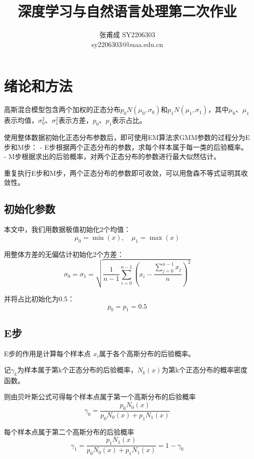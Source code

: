 \documentclass[11pt]{article}
\title{深度学习与自然语言处理第二次作业}
\author{张甫成 SY2206303\\sy2206303@buaa.edu.cn}
\begin{document}
    
    \maketitle



    \hypertarget{ux7eeaux8bbaux548cux65b9ux6cd5}{%
\section{绪论和方法}\label{ux7eeaux8bbaux548cux65b9ux6cd5}}

    高斯混合模型包含两个加权的正态分布\(p_0 N(\mu_0,\sigma_0)\)和\(p_1N(\mu_1,\sigma_1)\)，其中\(\mu_0\)、\(\mu_1\)表示均值，\(\sigma_0^2\)、\(\sigma_1^2\)表示方差，\(p_0\)、\(p_1\)表示占比。

使用整体数据初始化正态分布参数后，即可使用EM算法求GMM参数的过程分为E步和M步：
- E步根据两个正态分布的参数，求每个样本属于每一类的后验概率。 -
M步根据求出的后验概率，对两个正态分布的参数进行最大似然估计。

重复执行E步和M步，两个正态分布的参数即可收敛，可以用詹森不等式证明其收敛性。

    \hypertarget{ux521dux59cbux5316ux53c2ux6570}{%
\subsection{初始化参数}\label{ux521dux59cbux5316ux53c2ux6570}}

本文中，我们用数据极值初始化2个均值：
\[\mu_0=\min(x),\quad \mu_1=\max(x)\]

用整体方差的无偏估计初始化2个方差：
\[\sigma_0=\sigma_1=\sqrt{\frac{1}{n-1}\sum_{i=0}^{n-1}(x_i -  \frac{\sum_{j=0}^{n-1}x_j}{n})^2}\]

并将占比初始化为0.5： \[p_0=p_1=0.5\]

    \hypertarget{eux6b65}{%
\subsection{E步}\label{eux6b65}}

E步的作用是计算每个样本点 \(x_i\)属于各个高斯分布的后验概率。

记\(\gamma_k\)为样本属于第k个正态分布的后验概率，\(N_k(x)\)为第k个正态分布的概率密度函数。

则由贝叶斯公式可得每个样本点属于第一个高斯分布的后验概率
\[\gamma_0=\frac{p_0N_0(x)}{p_0N_0(x)+p_1N_1(x)}\]

每个样本点属于第二个高斯分布的后验概率
\[\gamma_1=\frac{p_1N_1(x)}{p_0N_0(x)+p_1N_1(x)}=1-\gamma_0\]
\end{document}
